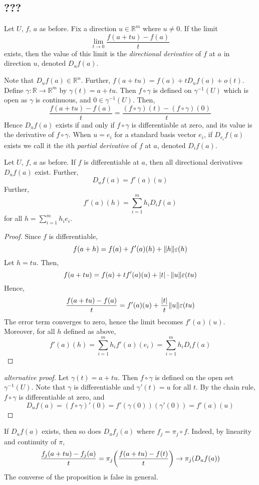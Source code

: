 \subsection{???}
\begin{definition}
	Let \( U \), \( f \), \( a \) as before.
	Fix a direction \( u \in \mathbb R^m \) where \( u \neq 0 \).
	If the limit
	\[
		\lim_{t \to 0} \frac{f(a+tu) - f(a)}{t}
	\]
	exists, then the value of this limit is the \textit{directional derivative} of \( f \) at \( a \) in direction \( u \), denoted \( D_u f(a) \).
\end{definition}
\begin{remark}
	Note that \( D_u f(a) \in \mathbb R^n \).
	Further, \( f(a+tu) = f(a) + t D_u f(a) + o(t) \).
	Define \( \gamma \colon \mathbb R \to \mathbb R^m \) by \( \gamma(t) = a + tu \).
	Then \( f \circ \gamma \) is defined on \( \gamma^{-1}(U) \) which is open as \( \gamma \) is continuous, and \( 0 \in \gamma^{-1}(U) \).
	Then,
	\[
		\frac{f(a+tu) - f(a)}{t} = \frac{(f \circ \gamma)(t) - (f \circ \gamma)(0)}{t}
	\]
	Hence \( D_u f(a) \) exists if and only if \( f \circ \gamma \) is differentiable at zero, and its value is the derivative of \( f \circ \gamma \).
	When \( u = e_i \) for a standard basis vector \( e_i \), if \( D_{e_i} f(a) \) exists we call it the \( i \)th \textit{partial derivative} of \( f \) at \( a \), denoted \( D_i f(a) \).
\end{remark}
\begin{proposition}
	Let \( U \), \( f \), \( a \) as before.
	If \( f \) is differentiable at \( a \), then all directional derivatives \( D_u f(a) \) exist.
	Further,
	\[
		D_u f(a) = f'(a)(u)
	\]
	Further,
	\[
		f'(a)(h) = \sum_{i=1}^m h_i D_i f(a)
	\]
	for all \( h = \sum_{i=1}^m h_i e_i \).
\end{proposition}
\begin{proof}
	Since \( f \) is differentiable,
	\[
		f(a+h) = f(a) + f'(a)(h) + \norm{h} \varepsilon(h)
	\]
	Let \( h = tu \).
	Then,
	\[
		f(a+tu) = f(a) + tf'(a)(u) + \abs{t} \cdot \norm{u} \varepsilon(tu)
	\]
	Hence,
	\[
		\frac{f(a+tu) - f(a)}{t} = f'(a)(u) + \frac{\abs{t}}{t} \norm{u} \varepsilon(tu)
	\]
	The error term converges to zero, hence the limit becomes \( f'(a)(u) \).
	Moreover, for all \( h \) defined as above,
	\[
		f'(a)(h) = \sum_{i=1}^m h_i f'(a)(e_i) = \sum_{i=1}^m h_i D_i f(a)
	\]
\end{proof}
\begin{proof}[alternative proof]
	Let \( \gamma(t) = a+tu \).
	Then \( f \circ \gamma \) is defined on the open set \( \gamma^{-1}(U) \).
	Note that \( \gamma \) is differentiable and \( \gamma'(t) = u \) for all \( t \).
	By the chain rule, \( f \circ \gamma \) is differentiable at zero, and
	\[
		D_u f(a) = (f \circ \gamma)'(0) = f'(\gamma(0))(\gamma'(0)) = f'(a)(u)
	\]
\end{proof}
\begin{remark}
	If \( D_u f(a) \) exists, then so does \( D_u f_j(a) \) where \( f_j = \pi_j \circ f \).
	Indeed, by linearity and continuity of \( \pi \),
	\[
		\frac{f_j(a+tu) - f_j(a)}{t} = \pi_j \qty(\frac{f(a+tu) - f(t)}{t}) \to \pi_j (D_u f(a))
	\]
	The converse of the proposition is false in general.
\end{remark}

